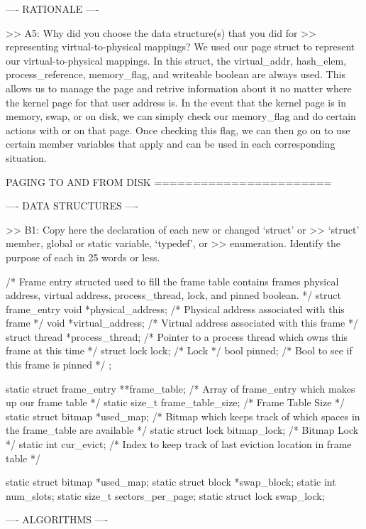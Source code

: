 ---- RATIONALE ----

>> A5: Why did you choose the data structure(s) that you did for
>> representing virtual-to-physical mappings?
We used our page struct to represent our virtual-to-physical mappings. In this struct, the 
virtual_addr, hash_elem, process_reference, memory_flag, and writeable boolean are always 
used. This allows us to manage the page and retrive information about it no matter where
the kernel page for that user address is. In the event that the kernel page is in memory, 
swap, or on disk, we can simply check our memory_flag and do certain actions with or on that
page. Once checking this flag, we can then go on to use certain member variables that apply
and can be used in each corresponding situation.

               PAGING TO AND FROM DISK
               =======================

---- DATA STRUCTURES ----

>> B1: Copy here the declaration of each new or changed `struct' or
>> `struct' member, global or static variable, `typedef', or
>> enumeration.  Identify the purpose of each in 25 words or less.

/* Frame entry structed used to fill the frame table 
contains frames physical address, virtual address,
process_thread, lock, and pinned boolean. */
struct frame_entry
{
    void *physical_address;         /* Physical address associated with this frame */
    void *virtual_address;          /* Virtual address associated with this frame */
    struct thread *process_thread;  /* Pointer to a process thread which owns this frame at this time */
    struct lock lock;               /* Lock */
    bool pinned;                    /* Bool to see if this frame is pinned */
};

static struct frame_entry **frame_table;    /* Array of frame_entry which makes up our frame table */
static size_t frame_table_size;             /* Frame Table Size */
static struct bitmap *used_map;             /* Bitmap which keeps track of which spaces in the frame_table are available */
static struct lock bitmap_lock;             /* Bitmap Lock */
static int cur_evict;                       /* Index to keep track of last eviction location in frame table */

static struct bitmap *used_map;
static struct block *swap_block;
static int num_slots;
static size_t sectors_per_page;
static struct lock swap_lock;

---- ALGORITHMS ----

